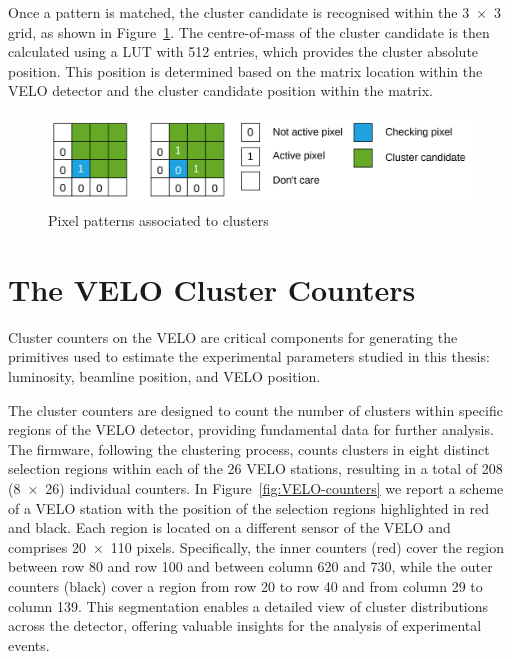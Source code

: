 Once a pattern is matched, the cluster candidate is recognised within the 3~×~3 grid, as shown in Figure~\ref{fig:cluster_recognition}. The centre-of-mass of the cluster candidate is then calculated using a LUT with 512 entries, which provides the cluster absolute position. This position is determined based on the matrix location within the VELO detector and the cluster candidate position within the matrix.

\begin{figure}
    \centering
    \includegraphics[width=\textwidth]{figures/cluster_recognition.png}
    \caption{Pixel patterns associated to clusters}
    \label{fig:cluster_recognition}
\end{figure}

\section{The VELO Cluster Counters}\label{sec:velo_counters}
Cluster counters on the VELO are critical components for generating the primitives used to estimate the experimental parameters studied in this thesis: luminosity, beamline position, and VELO position. 

The cluster counters are designed to count the number of clusters within specific regions of the VELO detector, providing fundamental data for further analysis. The firmware, following the clustering process, counts clusters in eight distinct selection regions within each of the 26 VELO stations, resulting in a total of 208 (8~×~26) individual counters. In Figure~\ref{fig:VELO-counters} we report a scheme of a VELO station with the position of the selection regions highlighted in red and black. Each region is located on a different sensor of the VELO and comprises 20~×~110 pixels. Specifically, the inner counters (red) cover the region between row 80 and row 100 and between column 620 and 730, while the outer counters (black) cover a region from row 20 to row 40 and from column 29 to column 139. This segmentation enables a detailed view of cluster distributions across the detector, offering valuable insights for the analysis of experimental events.%


